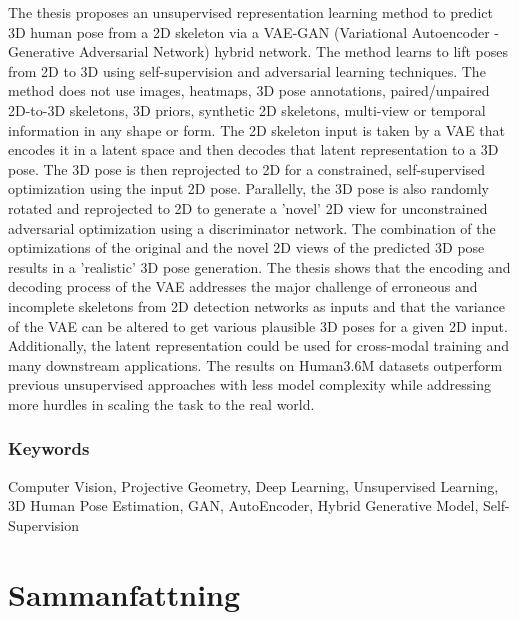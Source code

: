 The thesis proposes an unsupervised representation learning method to predict 3D human pose from a 2D skeleton via a VAE-GAN (Variational Autoencoder - Generative Adversarial Network) hybrid network. The method learns to lift poses from 2D to 3D using self-supervision and adversarial learning techniques. The method does not use images, heatmaps, 3D pose annotations, paired/unpaired 2D-to-3D skeletons, 3D priors, synthetic 2D skeletons, multi-view or temporal information in any shape or form. The 2D skeleton input is taken by a VAE that encodes it in a latent space and then decodes that latent representation to a 3D pose. The 3D pose is then reprojected to 2D for a constrained, self-supervised optimization using the input 2D pose. Parallelly, the 3D pose is also randomly rotated and reprojected to 2D to generate a 'novel' 2D view for unconstrained adversarial optimization using a discriminator network. The combination of the optimizations of the original and the novel 2D views of the predicted 3D pose results in a 'realistic' 3D pose generation. The thesis shows that the encoding and decoding process of the VAE addresses the major challenge of erroneous and incomplete skeletons from 2D detection networks as inputs and that the variance of the VAE can be altered to get various plausible 3D poses for a given 2D input. Additionally, the latent representation could be used for cross-modal training and many downstream applications. The results on Human3.6M datasets outperform previous unsupervised approaches with less model complexity while addressing more hurdles in scaling the task to the real world.


\subsection*{Keywords}
Computer Vision, Projective Geometry, Deep Learning, Unsupervised Learning, 3D Human Pose Estimation, GAN, AutoEncoder, Hybrid Generative Model, Self-Supervision

\newpage
\thispagestyle{plain}
\chapter*{Sammanfattning} 

